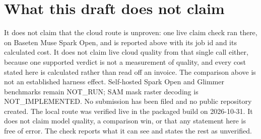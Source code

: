 \documentclass{article}
\begin{document}
\section{What this draft does not claim}

It does not claim that the cloud route is unproven: one live claim check ran there, on
Baseten Muse Spark Open, and is reported above with its job id and its calculated cost.
It does not claim live cloud quality from that single call either, because one supported
verdict is not a measurement of quality, and every cost stated here is calculated rather
than read off an invoice. The comparison above is not an established harness effect.
Self-hosted Spark Open and Glimmer benchmarks remain NOT_RUN; SAM mask raster decoding
is NOT_IMPLEMENTED. No submission has been filed and no public repository created.
The local route was verified live in the packaged build on
2026-10-31. It does not claim model quality, a comparison win, or that any statement here
is free of error. The check reports what it can see and states the rest as unverified.
\end{document}
